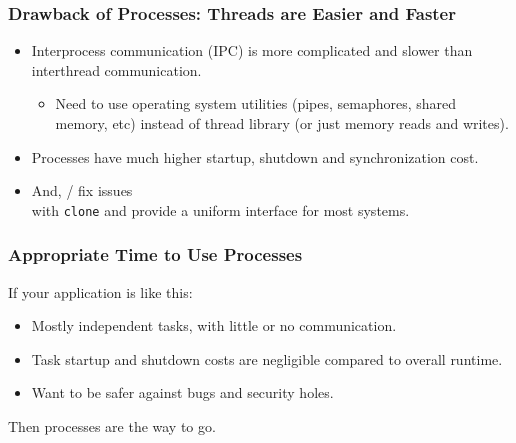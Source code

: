 \begin{frame}[fragile]
  \frametitle{Drawback of Processes: Threads are Easier and Faster}

  \begin{itemize}
    \item Interprocess communication (IPC) is more complicated and slower than interthread
          communication.
      \begin{itemize}
        \item Need to use operating system utilities (pipes, semaphores, shared
              memory, etc) instead of thread library (or just memory reads and writes).
      \end{itemize}
    \item Processes have much higher startup, shutdown and synchronization cost.
    \item And, / fix issues\\ with {\tt clone} and provide a
          uniform interface for most systems.
  \end{itemize}

\end{frame}

\begin{frame}[fragile]
  \frametitle{Appropriate Time to Use Processes}


  If your application is like this:
  \begin{itemize}
    \item Mostly independent tasks, with little or no communication.
    \item Task startup and shutdown costs are negligible compared to overall runtime.
    \item Want to be safer against bugs and security holes.
  \end{itemize}
  Then processes are the way to go. \\[1em]


\end{frame}

